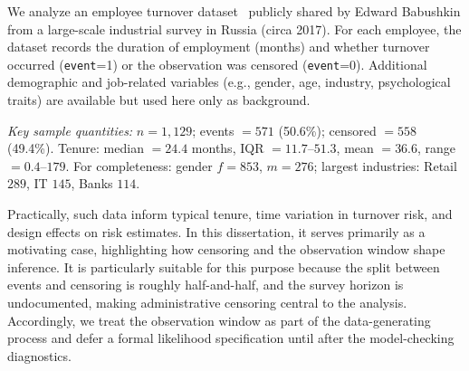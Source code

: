 We analyze an employee turnover dataset~\cite{babushkin_employee_turnover} publicly shared by Edward Babushkin from a large-scale industrial survey in Russia (circa 2017). For each employee, the dataset records the duration of employment (months) and whether turnover occurred (\texttt{event}=1) or the observation was censored (\texttt{event}=0). Additional demographic and job-related variables (e.g., gender, age, industry, psychological traits) are available but used here only as background.

\textit{Key sample quantities:} \(n=1{,}129\); events \(=571\) (50.6\%); censored \(=558\) (49.4\%). Tenure: median \(=24.4\) months, IQR \(=11.7\text{–}51.3\), mean \(=36.6\), range \(=0.4\text{–}179\). For completeness: gender \(f=853\), \(m=276\); largest industries: Retail \(289\), IT \(145\), Banks \(114\).

Practically, such data inform typical tenure, time variation in turnover risk, and design effects on risk estimates. In this dissertation, it serves primarily as a motivating case, highlighting how censoring and the observation window shape inference. It is particularly suitable for this purpose because the split between events and censoring is roughly half-and-half, and the survey horizon is undocumented, making administrative censoring central to the analysis. Accordingly, we treat the observation window as part of the data-generating process and defer a formal likelihood specification until after the model-checking diagnostics.
